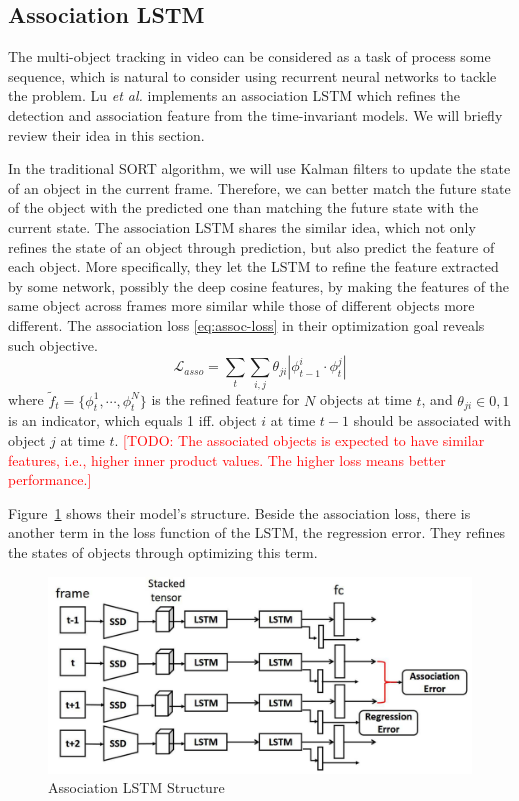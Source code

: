\documentclass[conference]{IEEEtran}
\newcommand{\todo}[1]{\textcolor{red}{[TODO: #1]}}
\begin{document}
\subsection{Association LSTM}
The multi-object tracking in video can be considered as a task of process some sequence, which is natural to consider using recurrent neural networks to tackle the problem.
Lu \textit{et al.} \cite{lu2017online} implements an association LSTM which refines the detection and association feature from the time-invariant models.
We will briefly review their idea in this section.

In the traditional SORT algorithm, we will use Kalman filters to update the state of an object in the current frame.
Therefore, we can better match the future state of the object with the predicted one than matching the future state with the current state.
The association LSTM shares the similar idea, which not only refines the state of an object through prediction, but also predict the feature of each object.
More specifically, they let the LSTM to refine the feature extracted by some network, possibly the deep cosine features, by making the features of the same object across frames more similar while those of different objects more different.
The association loss \eqref{eq:assoc-loss} in their optimization goal reveals such objective.
\begin{equation}
    \mathcal{L}_{asso} = \sum_t \sum_{i,j} \theta_{ji}|\phi_{t-1}^i \cdot \phi_t^j|
    \label{eq:assoc-loss}
\end{equation}
where $\tilde{f}_t = \{\phi_t^1, \cdots, \phi_t^N\}$ is the refined feature for $N$ objects at time $t$, and $\theta_{ji} \in 0, 1$ is an indicator, which equals 1 iff. object $i$ at time $t-1$ should be associated with object $j$ at time $t$.
\todo{The associated objects is expected to have similar features, i.e., higher inner product values.
The higher loss means better performance.}

Figure~\ref{fig:lstm-struct} shows their model's structure.
Beside the association loss, there is another term in the loss function of the LSTM, the regression error.
They refines the states of objects through optimizing this term.

\begin{figure}[h]
    \centering
    \includegraphics[width=0.99\linewidth]{fig/assoc_lstm.png}
    \caption{Association LSTM Structure\protect\footnotemark}
    \label{fig:lstm-struct}
\end{figure}
\end{document}
